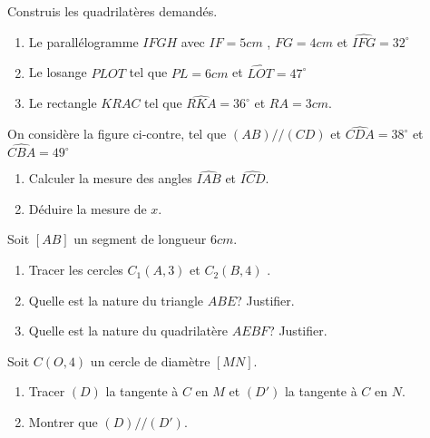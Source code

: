 \documentclass[a4paper,12pt]{article}
\begin{document}
\begin{exo}
Construis les quadrilatères demandés.
\begin{enumerate}
\item Le parallélogramme $IFGH$ avec $IF=5cm$ , $FG=4cm$ et $\widehat{IFG}=32^{\circ}$
\item Le losange $PLOT$ tel que $PL=6cm$ et $\widehat{LOT}=47^{\circ}$
\item Le rectangle $KRAC$ tel que $\widehat{RKA}=36^{\circ}$ et $RA=3cm$.
\end{enumerate}
\end{exo}

\begin{exo}
\begin{minipage}{.5\linewidth}
On considère la figure ci-contre, tel que $(AB)//(CD)$ et $\widehat{CDA}=38^{\circ}$ et $\widehat{CBA}=49^{\circ}$
\begin{enumerate}
\item Calculer la mesure des angles $\widehat{IAB}$ et $\widehat{ICD}$.
\item Déduire la mesure de $x$.
\end{enumerate}
\end{minipage}%
\begin{minipage}{.5\linewidth}
\end{minipage}

\end{exo}

\begin{exo}
Soit $[AB]$ un segment de longueur $6cm$.
\begin{enumerate}
\item Tracer les cercles $C_1(A,3)$ et $C_2(B,4)$ .
\item Quelle est la nature du triangle $ABE$? Justifier.
\item Quelle est la nature du quadrilatère $AEBF$? Justifier.
\end{enumerate}
\end{exo}

\begin{exo}
Soit $C(O,4)$ un cercle de diamètre $[MN]$.
\begin{enumerate}
\item Tracer $(D)$ la tangente à $C$ en $M$ et $(D')$ la tangente à $C$ en $N$.
\item Montrer que $(D)//(D')$.
\end{enumerate}
\end{exo}
\end{document}
